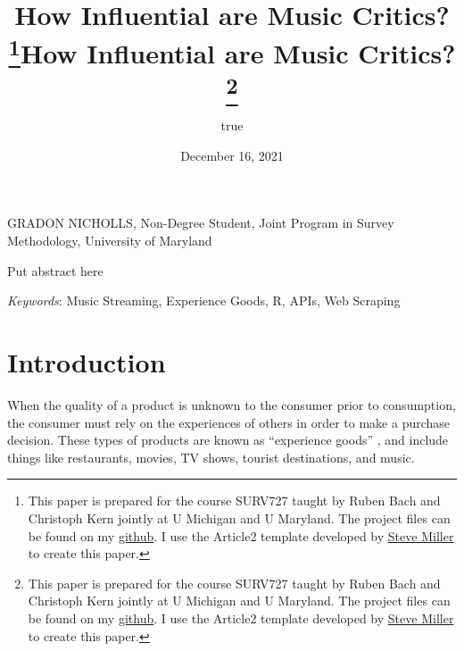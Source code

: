 \documentclass[
  11pt,
]{article}
\title{How Influential are Music Critics?\thanks{This paper is prepared
for the course SURV727 taught by Ruben Bach and Christoph Kern jointly
at U Michigan and U Maryland. The project files can be found on my
\href{https://github.com/gnicholl/SURV727FinalProject}{github}. I use
the Article2 template developed by
\href{https://github.com/svmiller/stevetemplates}{Steve Miller} to
create this paper.}}
\author{true}
\date{December 16, 2021}
\title{How Influential are Music Critics?\thanks{This paper is prepared
for the course SURV727 taught by Ruben Bach and Christoph Kern jointly
at U Michigan and U Maryland. The project files can be found on my
\href{https://github.com/gnicholl/SURV727FinalProject}{github}. I use
the Article2 template developed by
\href{https://github.com/svmiller/stevetemplates}{Steve Miller} to
create this paper.}  }
\date{}
\renewenvironment{abstract}
 {{%
    \setlength{\leftmargin}{0mm}
    \setlength{\rightmargin}{\leftmargin}%
  }%
  \relax}
 {\endlist}
\begin{document}



{%
\setlength{\parindent}{0pt}
\thispagestyle{plain}
{%
\maketitle  %

}




{
   \vskip 13.5pt\relax \normalsize\fontsize{11}{12}
   \MakeUppercase{Gradon Nicholls}, \small{Non-Degree Student, Joint
Program in Survey Methodology, University of Maryland}   

}

}








\begin{abstract}


    \vskip 8.5pt %

\noindent \small{Put abstract here}


\vskip 8.5pt \noindent \emph{Keywords}: Music Streaming, Experience
Goods, R, APIs, Web Scraping \par




\end{abstract}


\vskip -8.5pt




\setlength{\parindent}{16pt}
\setlength{\parskip}{0pt}

\hypertarget{introduction}{%
\section{Introduction}\label{introduction}}

When the quality of a product is unknown to the consumer prior to
consumption, the consumer must rely on the experiences of others in
order to make a purchase decision. These types of products are known as
``experience goods'' \citep{reinstein2005influence}, and include things
like restaurants, movies, TV shows, tourist destinations, and music.
\end{document}
